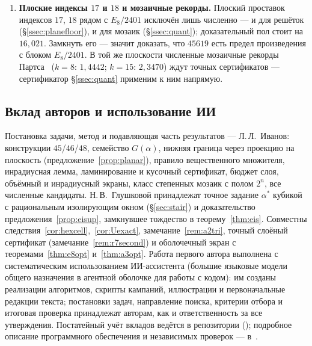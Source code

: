 \begin{enumerate}[leftmargin=1.5em,itemsep=4pt]
\emph{$K_{12}$ --- самый большой запас}: подрешётка
$\Gamma\subset K_{12}$, улучшающая $3^{12}$, обязана иметь $\lambda_1^2\ge30$
и индекс в окне $[177\,979,\ 3^{12}]$ --- свободный множитель $2{,}99$;
лестница подобий в окне пуста (эйзенштейновы нормы идут $7,9,12,13,\dots$),
целиться надо в $\Z[\omega]$-подмодули с произвольной нормой определителя; оба
числа условны по $\gamma_{12}=4/\sqrt3$.

\emph{Решётка Лича}: пол
$5\,688\,009\,064$ при рекорде $7^{12}=13\,841\,287\,201$, запас $2{,}43$, и он
безусловен; оболочку $|v|^2=26$ радиальный свидетель закрывает с промахом
$0{,}3\%$, и нерадиальный свидетель для этой одной оболочки доказал бы
неулучшаемость $7^{12}$ на $\Lambda_{24}$.

\item \textbf{Плоские индексы $17$ и $18$ и мозаичные рекорды.} Плоский
проставок индексов $17$, $18$ рядом с $E_8/2401$ исключён лишь численно --- и
для решёток (\S\ref{ssec:planefloor}), и для мозаик (\S\ref{ssec:quant});
доказательный пол стоит на $16{,}021$. Замкнуть его --- значит доказать, что
$45619$ есть предел произведения с блоком $E_8/2401$. В той же плоскости
численные мозаичные рекорды Партса~\cite{Parts2023} ($k=8$: $1{,}4442$;
$k=15$: $2{,}3470$) ждут точных сертификатов --- сертификатор
\S\ref{ssec:quant} применим к ним напрямую.
\end{enumerate}

\subsection*{Вклад авторов и использование ИИ}

Постановка задачи, метод и подавляющая часть результатов --- Л.\,Л.~Иванов:
конструкции $45$/$46$/$48$, семейство $G(\alpha)$, нижняя граница через проекцию на плоскость
(предложение~\ref{prop:planar}), правило вещественного множителя, инрадиусная
лемма, ламинирование и кусочный сертификат, бюджет слоя, объёмный и
инрадиусный экраны, класс степенных мозаик с полом $2^n$, все численные
кандидаты. Н.\,В.~Глушковой принадлежат точное задание $\alpha^*$ кубикой с
рациональным изолирующим окном (\S\ref{sec:stair}) и доказательство
предложения~\ref{prop:eisup}, замкнувшее тождество в теорему~\ref{thm:eis}.
Совместны следствия~\ref{cor:hexcell},~\ref{cor:Uexact},
замечание~\ref{rem:a2tri}, точный слоёный сертификат
(замечание~\ref{rem:r7second}) и оболочечный экран с теоремами~\ref{thm:e8opt}
и~\ref{thm:a3opt}. Работа первого автора выполнена с систематическим
использованием ИИ-ассистента (большие языковые модели общего назначения в
агентной оболочке для работы с кодом): им созданы реализации алгоритмов,
скрипты кампаний, иллюстрации и первоначальные редакции текста; постановки
задач, направление поиска, критерии отбора и итоговая проверка принадлежат
авторам, как и ответственность за все утверждения. Постатейный учёт вкладов
ведётся в репозитории (); подробное описание
программного обеспечения и независимых проверок --- в~\cite{Repo}.
